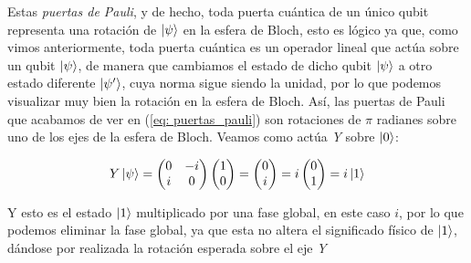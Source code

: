 \documentclass{article}
\numberwithin{equation}{section} %
\begin{document}
    \vspace{2.5mm}

    Estas \textit{puertas de Pauli}, y de hecho, toda puerta cuántica de un único qubit representa una rotación de \( \ket{\psi} \) en la esfera de Bloch, esto es lógico ya que, como vimos anteriormente, toda puerta cuántica es un operador lineal que actúa sobre un qubit \( \ket{\psi} \), de manera que cambiamos el estado de dicho qubit \( \ket{\psi} \) a otro estado diferente \( \ket{\psi'} \), cuya norma sigue siendo la unidad, por lo que podemos visualizar muy bien la rotación en la esfera de Bloch. Así, las puertas de Pauli que acabamos de ver en (\ref{eq: puertas_pauli}) son rotaciones de \( \pi \) radianes sobre uno de los ejes de la esfera de Bloch. Veamos como actúa \textit{Y} sobre \( \ket{0} \):

    \begin{equation*}
        Y \ket{\psi} = \begin{pmatrix}
            0 & -i \\
            i & 0
        \end{pmatrix} \begin{pmatrix}
            1 \\
            0
        \end{pmatrix} = \begin{pmatrix}
            0 \\
            i
        \end{pmatrix} = i \begin{pmatrix}
            0 \\
            1
        \end{pmatrix} = i \ket{1}
    \end{equation*}

    \vspace{2.5mm}

    Y esto es el estado \( \ket{1} \) multiplicado por una fase global, en este caso \( i \), por lo que podemos eliminar la fase global, ya que esta no altera el significado físico de \( \ket{1} \), dándose por realizada la rotación esperada sobre el eje \textit{Y}

    \vspace{5mm}
\end{document}
